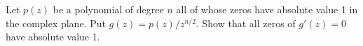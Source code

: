 Let $p(z)$ be a polynomial of degree $n$ all of whose zeros have absolute
value 1 in the complex  plane. Put $g(z) = p(z)/z^{n/2}$. Show that all zeros
of $g'(z) = 0$ have absolute value 1.
